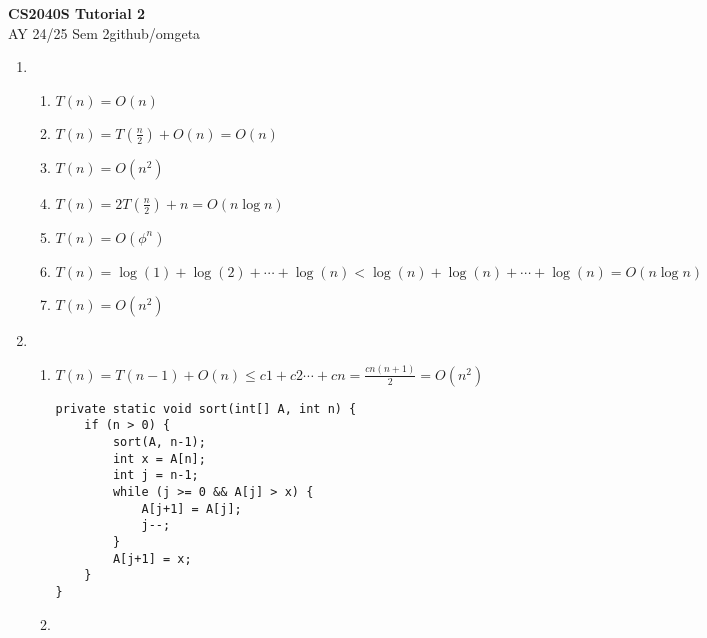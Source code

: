 \documentclass[12pt, a4paper]{article}
\newcommand{\mytitle}{CS2040S Tutorial 2}
\newcommand{\myauthor}{github/omgeta}
\newcommand{\mydate}{AY 24/25 Sem 2}
\begin{document}
\raggedright
\footnotesize
\begin{center}
{\normalsize{\textbf{\mytitle}}} \\
{\footnotesize{\mydate\hspace{2pt}\textemdash\hspace{2pt}\myauthor}}
\end{center}
\begin{enumerate}[Q\arabic*.]
  \item 
    \begin{enumerate}[(\alph*.)]
      \item $T(n) = O(n)$
      \item $T(n) = T(\frac{n}{2}) + O(n) = O(n)$
      \item $T(n) = O(n^2)$
      \item $T(n) = 2T(\frac{n}{2}) + n = O(n\log n)$
      \item $T(n) = O(\phi^n)$
      \item $T(n) = \log(1) + \log(2) + \cdots + \log(n) < \log(n) + \log(n) + \cdots + \log(n) = O(n\log n)$
      \item $T(n) = O(n^2)$
    \end{enumerate}
\pagebreak
  \item 
    \begin{enumerate}[(\alph*.)]
      \item $T(n) = T(n-1) + O(n) \leq c1 + c2 \cdots + cn = \frac{cn(n+1)}{2} = O(n^2)$
        \begin{lstlisting}
private static void sort(int[] A, int n) {
    if (n > 0) {
        sort(A, n-1);
        int x = A[n];
        int j = n-1;
        while (j >= 0 && A[j] > x) {
            A[j+1] = A[j];
            j--;
        }
        A[j+1] = x;
    }
}
        \end{lstlisting}

      \item 



\end{enumerate}
\end{enumerate}
\end{document}
